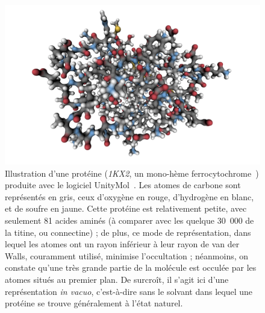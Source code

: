 	\begin{figure}[H]
		\centering
		\includegraphics[width=\textwidth]{figures/ch1/1KX2}
		\caption{Illustration d'une protéine (\emph{1KX2}, un mono-hème ferrocytochrome~\cite{bartalesi2002solution}) produite avec le logiciel UnityMol~\cite{doutreligne2014unitymol}. Les atomes de carbone sont représentés en gris, ceux d'oxygène en rouge, d'hydrogène en blanc, et de soufre en jaune. Cette protéine est relativement petite, avec seulement 81 acides aminés (à comparer avec les quelque 30~000 de la titine, ou connectine) ; de plus, ce mode de représentation, dans lequel les atomes ont un rayon inférieur à leur rayon de van der Walls, couramment utilisé, minimise l'occultation ; néanmoins, on constate qu'une très grande partie de la molécule est occulée par les atomes situés au premier plan. De surcroît, il s'agit ici d'une représentation \emph{in vacuo}, c'est-à-dire sans le solvant dans lequel une protéine se trouve généralement à l'état naturel.}
		\label{fig:1KX2}
	\end{figure}
	
